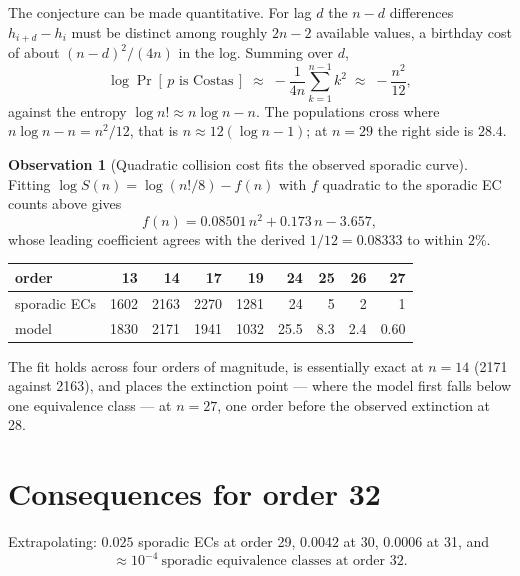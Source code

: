 \documentclass[11pt,a4paper,oneside]{report}
\theoremstyle{definition}
\newtheorem{observation}[theorem]{Observation}
\begin{document}
The conjecture can be made quantitative. For lag $d$ the $n-d$ differences
$h_{i+d}-h_i$ must be distinct among roughly $2n-2$ available values, a birthday
cost of about $(n-d)^2/(4n)$ in the log. Summing over $d$,
\[
\log \Pr[\,p \text{ is Costas}\,] \;\approx\; -\frac{1}{4n}\sum_{k=1}^{n-1}k^2
\;\approx\; -\frac{n^2}{12},
\]
against the entropy $\log n! \approx n\log n - n$. The populations cross where
$n\log n - n = n^2/12$, that is $n \approx 12(\log n - 1)$; at $n=29$ the right
side is $28.4$.

\begin{observation}[Quadratic collision cost fits the observed sporadic curve]
\label{p6-obs:extinction}
Fitting $\log S(n) = \log(n!/8) - f(n)$ with $f$ quadratic to the sporadic EC
counts above gives
\[
f(n) = 0.08501\,n^2 + 0.173\,n - 3.657,
\]
whose leading coefficient agrees with the derived $1/12 = 0.08333$ to within
$2\%$.
\end{observation}

\begin{center}
\begin{tabular}{@{}lrrrrrrrr@{}}
\toprule
order & 13 & 14 & 17 & 19 & 24 & 25 & 26 & 27 \\
\midrule
sporadic ECs & 1602 & 2163 & 2270 & 1281 & 24 & 5 & 2 & 1 \\
model & 1830 & 2171 & 1941 & 1032 & 25.5 & 8.3 & 2.4 & 0.60 \\
\bottomrule
\end{tabular}
\end{center}

The fit holds across four orders of magnitude, is essentially exact at $n=14$
(2171 against 2163), and places the extinction point --- where the model first
falls below one equivalence class --- at $n=27$, one order before the observed
extinction at 28.

\section{Consequences for order 32}

Extrapolating: $0.025$ sporadic ECs at order 29, $0.0042$ at 30, $0.0006$ at 31,
and
\[
\boxed{\;\approx 10^{-4}\ \text{sporadic equivalence classes at order }32.\;}
\]
\end{document}
